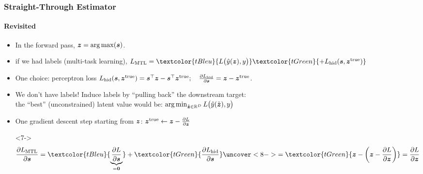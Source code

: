 \begin{frame}
\frametitle{Straight-Through Estimator}
\framesubtitle{Revisited}
\begin{itemize}
\item<2-> In the forward pass, $\boldsymbol{z} = \operatorname*{arg\,max}(\boldsymbol{s})$.
\item<3-> if we had labels (multi-task learning),
$L_\text{MTL} = \textcolor{tBleu}{L\big(\hat{y}(\z), y\big)} \textcolor{tGreen}{+
L_\text{hid}(\s,\z^\text{true})}$
\item<4-> One choice: perceptron loss
\textcolor{tGreen}{$L_\text{hid}(\boldsymbol{s},\boldsymbol{z}^\text{true}) = \boldsymbol{s}^\top\boldsymbol{z} - \boldsymbol{s}^\top
\boldsymbol{z}^\text{true};
\quad
\frac{\partial L_\text{hid}}{\partial \boldsymbol{s}} = \boldsymbol{z} - \boldsymbol{z}^\text{true}
$}.
\item<5-> We don't have labels! Induce labels by ``pulling back'' the downstream
target:
\\ \quad the ``best'' (unconstrained) latent value would be:\quad
$\operatorname*{arg\,min}_{\tilde{\boldsymbol{z}}\in\mathbb{R}^D} L\big(\hat{y}(\tilde{\boldsymbol{z}}), y\big)$
\item<6-> One gradient descent step starting from $\boldsymbol{z}$: $\boldsymbol{z}^\text{true} \leftarrow
\boldsymbol{z} -  \frac{\partial L}{\partial \boldsymbol{z}}$
\item[]<7->%
$$
\pfrac{L_\text{MTL}}{\s} =
\textcolor{tBleu}{\underbrace{\pfrac{L}{\s}}_{=\bs{0}}} +
\textcolor{tGreen}{\pfrac{L_\text{hid}}{\s}}
\uncover<8->{%
= \textcolor{tGreen}{\z - \left(\z -
\pfrac{L}{\z}
\right)
} =
\pfrac{L}{\z}
}
$$
\end{itemize}%
%
\end{frame}


